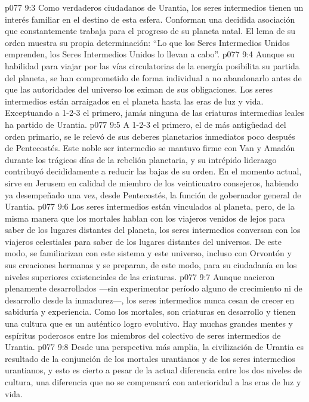 \vs p077 9:3 Como verdaderos ciudadanos de Urantia, los seres intermedios tienen un interés familiar en el destino de esta esfera. Conforman una decidida asociación que constantemente trabaja para el progreso de su planeta natal. El lema de su orden muestra su propia determinación: “Lo que los Seres Intermedios Unidos emprenden, los Seres Intermedios Unidos lo llevan a cabo”.
\vs p077 9:4 Aunque su habilidad para viajar por las vías circulatorias de la energía posibilita su partida del planeta, se han comprometido de forma individual a no abandonarlo antes de que las autoridades del universo los eximan de sus obligaciones. Los seres intermedios están arraigados en el planeta hasta las eras de luz y vida. Exceptuando a 1\hyp{}2\hyp{}3 el primero, jamás ninguna de las criaturas intermedias leales ha partido de Urantia.
\vs p077 9:5 A 1\hyp{}2\hyp{}3 el primero, el de más antigüedad del orden primario, se le relevó de sus deberes planetarios inmediatos poco después de Pentecostés. Este noble ser intermedio se mantuvo firme con Van y Amadón durante los trágicos días de la rebelión planetaria, y su intrépido liderazgo contribuyó decididamente a reducir las bajas de su orden. En el momento actual, sirve en Jerusem en calidad de miembro de los veinticuatro consejeros, habiendo ya desempeñado una vez, desde Pentecostés, la función de gobernador general de Urantia.
\vs p077 9:6 \pc Los seres intermedios están vinculados al planeta, pero, de la misma manera que los mortales hablan con los viajeros venidos de lejos para saber de los lugares distantes del planeta, los seres intermedios conversan con los viajeros celestiales para saber de los lugares distantes del universos. De este modo, se familiarizan con este sistema y este universo, incluso con Orvontón y sus creaciones hermanas y se preparan, de este modo, para su ciudadanía en los niveles superiores existenciales de las criaturas.
\vs p077 9:7 Aunque nacieron plenamente desarrollados ---sin experimentar período alguno de crecimiento ni de desarrollo desde la inmadurez---, los seres intermedios nunca cesan de crecer en sabiduría y experiencia. Como los mortales, son criaturas en desarrollo y tienen una cultura que es un auténtico logro evolutivo. Hay muchas grandes mentes y espíritus poderosos entre los miembros del colectivo de seres intermedios de Urantia.
\vs p077 9:8 Desde una perspectiva más amplia, la civilización de Urantia es resultado de la conjunción de los mortales urantianos y de los seres intermedios urantianos, y esto es cierto a pesar de la actual diferencia entre los dos niveles de cultura, una diferencia que no se compensará con anterioridad a las eras de luz y vida.
